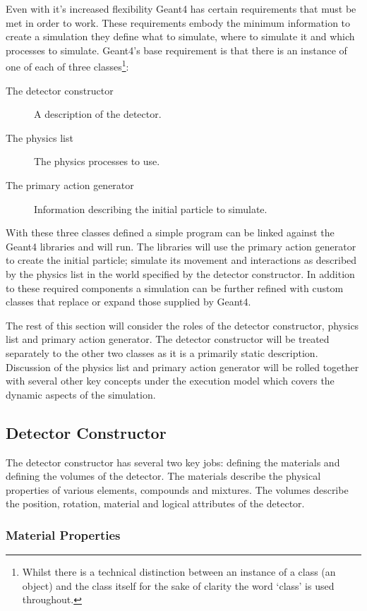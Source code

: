 Even with it's increased flexibility Geant4 has certain requirements that must be met in order to work. These requirements embody the minimum information to create a simulation they define what to simulate, where to simulate it and which processes to simulate. Geant4's base requirement is that there is an instance of one of each of three classes\footnote{Whilst there is a technical distinction between an instance of a class (an object) and the class itself for the sake of clarity the word `class' is used throughout.}:
\begin{description}
  \item[The detector constructor] A description of the detector.
  \item[The physics list] The physics processes to use.
  \item[The primary action generator] Information describing the initial particle to simulate.
\end{description}
With these three classes defined a simple program can be linked against the Geant4 libraries and will run. The libraries will use the primary action generator to create the initial particle; simulate its movement and interactions as described by the physics list in the world specified by the detector constructor. In addition to these required components a simulation can be further refined with custom classes that replace or expand those supplied by Geant4.

The rest of this section will consider the roles of the detector constructor, physics list and primary action generator. The detector constructor will be treated separately to the other two classes as it is a primarily static description. Discussion of the physics list and primary action generator will be rolled together with several other key concepts under the execution model which covers the dynamic aspects of the simulation.

\subsection{Detector Constructor} %
\label{sub:detector_constructor}
The detector constructor has several two key jobs: defining the materials and defining the volumes of the detector. The materials describe the physical properties of various elements, compounds and mixtures. The volumes describe the position, rotation, material and logical attributes of the detector. 

\subsubsection{Material Properties} %
\label{ssub:material_properties}

